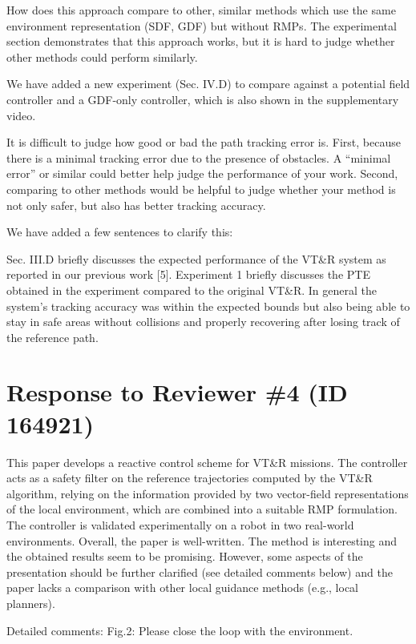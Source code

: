 \documentclass[a4paper,11pt]{article}
\begin{document}
\begin{displayquote}
	How does this approach compare to other, similar methods which use the
	same environment representation (SDF, GDF) but without RMPs. The
	experimental section demonstrates that this approach works, but it is
	hard to judge whether other methods could perform similarly.
\end{displayquote}

We have added a new experiment (Sec. IV.D) to compare against a potential field 
controller and a GDF-only controller, which is also shown in the supplementary 
video.

\begin{displayquote}
	It is difficult to judge how good or bad the path tracking error is.
	First, because there is a minimal tracking error due to the presence of
	obstacles. A “minimal error” or similar could better help judge the
	performance of your work. Second, comparing to other methods would be
	helpful to judge whether your method is not only safer, but also has
	better tracking accuracy.
\end{displayquote}

We have added a few sentences to clarify this:

\begin{outline}[enumerate]
	\1 Sec. III.D briefly discusses the expected performance of the VT\&R 
	system as reported in our previous work [5].
	\1 Experiment 1 briefly discusses the PTE obtained in the experiment 
	compared to the original VT\&R.
	\1 In general the system's tracking accuracy was within the expected bounds 
	but also being able to stay in safe areas without collisions and properly 
	recovering after losing track of the reference path.
\end{outline}

\pagebreak
\section*{Response to Reviewer \#4 (ID 164921)}

\begin{displayquote}
	This paper develops a reactive control scheme for VT\&R missions. The
	controller acts as a safety filter on the reference trajectories
	computed by the VT\&R algorithm, relying on the information provided by
	two vector-field representations of the local environment, which are
	combined into a suitable RMP formulation. The controller is validated
	experimentally on a robot in two real-world environments. Overall, the
	paper is well-written. The method is interesting and the obtained
	results seem to be promising. However, some aspects of the presentation
	should be further clarified (see detailed comments below) and the paper
	lacks a comparison with other local guidance methods (e.g., local
	planners).
	
	Detailed comments:
	Fig.2: Please close the loop with the environment.
\end{displayquote}
\end{document}
